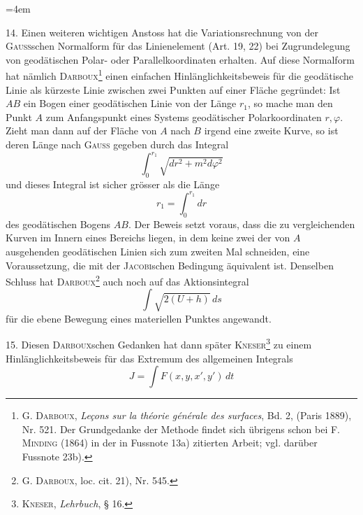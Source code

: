 \clearpage\begingroup
\emergencystretch=4em\relax\NoSourceHead{}
\renewcommand{\thefootnote}{\arabic{footnote})}\setcounter{footnote}{20}
\newcommand{\BolzaEqualAboveLess}{\mathrel{\vcenter{\offinterlineskip\hbox{$\scriptstyle=$}\kern-.15ex\hbox{$<$}}}}
\begin{center}\end{center}
\noindent\hspace*{\parindent}14. Einen weiteren wichtigen Anstoss hat die Variationsrechnung von
der \textsc{Gauss}schen Normalform für das Linienelement (Art. 19, 22) bei Zugrundelegung
von geodätischen Polar- oder Parallelkoordinaten erhalten. Auf diese
Normalform hat nämlich \textsc{Darboux}\footnote{G. \textsc{Darboux}, \textit{Leçons sur la théorie générale des surfaces}, Bd. 2, (Paris 1889), Nr. 521. Der Grundgedanke
der Methode findet sich übrigens schon bei F. \textsc{Minding} (1864) in der in Fussnote 13a) zitierten
Arbeit; vgl. darüber Fussnote 23b).} einen einfachen Hinlänglichkeitsbeweis
für die geodätische Linie als kürzeste Linie zwischen zwei Punkten auf einer
Fläche gegründet: Ist $AB$ ein Bogen einer geodätischen Linie von der Länge
$r_1$, so mache man den Punkt $A$ zum Anfangspunkt eines Systems geodätischer
Polarkoordinaten $r,\varphi$. Zieht man dann auf der Fläche von $A$ nach $B$ irgend
eine zweite Kurve, so ist deren Länge nach \textsc{Gauss} gegeben durch das Integral
\[
\int_0^{r_1}\sqrt{dr^2+m^2d\varphi^2}
\]
und dieses Integral ist sicher grösser als die Länge
\[
r_1=\int_0^{r_1}dr
\]
des geodätischen Bogens $AB$. Der Beweis setzt voraus, dass die zu vergleichenden
Kurven im Innern eines Bereichs liegen, in dem keine zwei der
von $A$ ausgehenden geodätischen Linien sich zum zweiten Mal schneiden,
eine Voraussetzung, die mit der \textsc{Jacobi}schen Bedingung äquivalent ist. Denselben
Schluss hat \textsc{Darboux}\footnote{G. \textsc{Darboux}, loc. cit. 21), Nr. 545.} auch noch auf das Aktionsintegral
\[
\int\sqrt{2(U+h)}\,ds
\]
für die ebene Bewegung eines materiellen Punktes angewandt.
\par\noindent\hspace*{\parindent}15. Diesen \textsc{Darboux}schen Gedanken hat dann später \textsc{Kneser}\footnote{\textsc{Kneser}, \textit{Lehrbuch}, § 16.} zu einem
Hinlänglichkeitsbeweis für das Extremum des allgemeinen Integrals
\begin{equation*}\tag{8}
J=\int F(x,y,x',y')\,dt
\end{equation*}

